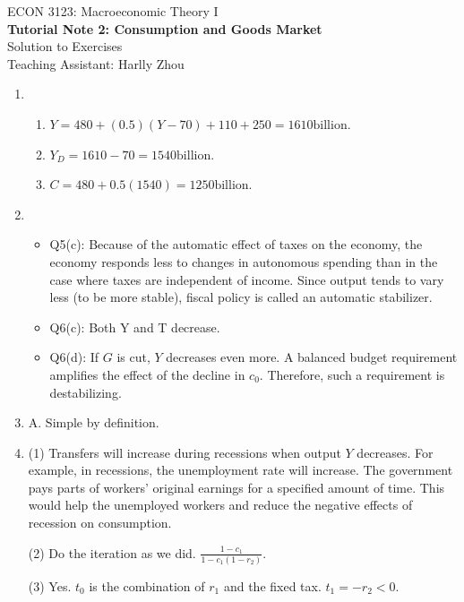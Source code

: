 \documentclass[12pt]{article}
\numberwithin{equation}{section}
\begin{document}
\begin{center}
    ECON 3123: Macroeconomic Theory I\\
    {\large \textbf{Tutorial Note 2: Consumption and Goods Market}}\\
    Solution to Exercises\\
    Teaching Assistant: Harlly Zhou
\end{center}

\begin{enumerate}[label=\arabic*.]
    \item \begin{enumerate}[label=\alph*.]
        \item $Y=480+(0.5)(Y-70)+110+250=1610\text{billion}$.
        \item $Y_D = 1610 - 70 = 1540\text{billion}$.
        \item $C = 480 + 0.5(1540) = 1250 \text{billion}$.
        \end{enumerate}
    \item \begin{itemize}
        \item Q5(c): Because of the automatic effect of taxes on the economy, the economy responds less to changes in autonomous spending than in the case where taxes are independent of income. Since output tends to vary less (to be more stable), fiscal policy is called an automatic stabilizer.
        \item Q6(c): Both Y and T decrease.
        \item Q6(d): If $G$ is cut, $Y$ decreases even more. A balanced budget requirement amplifies the effect of the decline in $c_0$. Therefore, such a requirement is destabilizing.
        \end{itemize}
    \item A. Simple by definition.
    \item (1) Transfers will increase during recessions when output $Y$ decreases. For example, in recessions, the unemployment rate will increase. The government pays parts of workers' original earnings for a specified amount of time. This would help the unemployed workers and reduce the negative effects of recession on consumption.

    (2) Do the iteration as we did. $\frac{1-c_1}{1-c_1(1-r_2)}$.
    
    (3) Yes. $t_0$ is the combination of $r_1$ and the fixed tax. $t_1 = -r_2<0$.
\end{enumerate}
\end{document}
